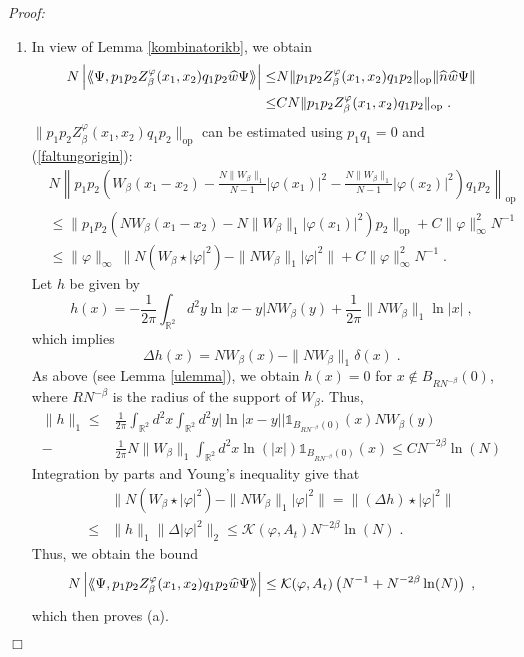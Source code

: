 \documentclass[11pt, english, american]{article}
\newcommand{\laa}{\langle\hspace{-0.08cm}\langle}
\newcommand{\raa}{\rangle\hspace{-0.08cm}\rangle}
\newenvironment{proof}{\emph{Proof:}}{\begin{flushright} $ \Box $ \end{flushright}}
\renewcommand{\phi}{\varphi}
\newcommand{\potdiff}{Z}
\begin{document}
\begin{proof}
\begin{enumerate}
\item
In view of Lemma \ref{kombinatorikb}, we obtain
\begin{align*}
N \left|\laa\Psi, p_1p_2
\potdiff^\phi_\beta(x_1,x_2) q_1p_2\widehat{w}\Psi\raa\right|
%
\leq&  N\|p_1p_2
\potdiff^\phi_\beta(x_1,x_2) q_1p_2\|_{\text{op}}\|\widehat{n}\widehat{w}\Psi\|
%
\\\leq&  CN\|p_1p_2
\potdiff^\phi_\beta(x_1,x_2) q_1p_2\|_{\text{op}}\;.
\end{align*}
$\|p_1p_2
\potdiff^\phi_\beta(x_1,x_2) q_1p_2\|_{\text{op}}$ can be estimated using $p_1q_1=0$ and (\ref{faltungorigin}): 
\begin{align*}
& N
\left\|
	p_1p_2
	\left(
		W_\beta(x_1-x_2)-\frac{N\|W_\beta\|_1}{N-1}|\phi(x_1)|^2-\frac{N\|W_\beta\|_1}{N-1}|		
		\phi(x_2)|^2
	\right) q_1p_2
\right\|_{\text{op}}
\\
&\leq\|p_1p_2 
(NW_\beta(x_1-x_2)-N\|W_\beta\|_1|\phi(x_1)|^2)
p_2\|_{\text{op}}
+C \|\phi\|_\infty^2 N^{-1}
\\
&\leq \| \phi \|_{\infty} \ \|N(W_\beta\star|\phi|^2)-\|NW_\beta\|_1|\phi|^2\|+C \|\phi\|_\infty^2 N^{-1}\;.
%
\end{align*}
Let $h$ be given by 
$$h(x)=- \frac{1}{2 \pi}\int_{\mathbb{R}^2}d^2y \ln |x-y| NW_\beta(y) + \frac{1}{2\pi}\|NW_\beta\|_1\ln |x|
\;,
 $$
which implies
$$\Delta h(x)=N W_\beta(x) - \|NW_\beta\|_1 \delta(x)\;.$$ 
As above (see Lemma \ref{ulemma}), we obtain
$h(x)=0$ for $x \notin B_{RN^{- \beta}}(0)$, where $R N^{-\beta}$ is the radius of the support of $W_\beta$.
Thus,
\begin{align} \label{roemisch I potetnialestimate}
\|h\|_1
\leq&
\frac{1}{2 \pi}
\int_{\mathbb{R}^2}d^2x \int_{\mathbb{R}^2}  d^2y|\ln |x-y|| \mathds{1}_{B_{RN^{- \beta}}(0)}(x) NW_\beta(y)
\\
-& 
\frac{1}{2 \pi}
 N\|W_\beta\|_1\int_{\mathbb{R}^2}  d^2x  \ln(|x|) \mathds{1}_{B_{RN^{- \beta}}(0)}(x)
\leq 
C N^{-2 \beta} \ln(N)
\end{align}
Integration by parts and Young's inequality give that
\begin{align*}
&\| N(W_\beta\star|\phi|^2)-\|NW_\beta\|_1|\phi|^2\|=\|(\Delta h)\star|\phi|^2\|
%
\\\leq& \| h\|_1 \|\Delta|\phi|^2\|_2
\leq \mathcal{K}(\varphi, A_t) N^{-2\beta} \ln(N) 
\;.
\end{align*}
Thus, we obtain the bound
\begin{align}
N \left|\laa\Psi, p_1p_2
\potdiff^\phi_\beta(x_1,x_2) q_1p_2\widehat{w}\Psi\raa\right|
\leq
\mathcal{K}(\phi, A_t)
 \left( N^{-1}+   N^{- 2 \beta } \ln(N) \right)
\;,
\end{align}
which then proves (a).



\end{enumerate}
\end{proof}
\end{document}
